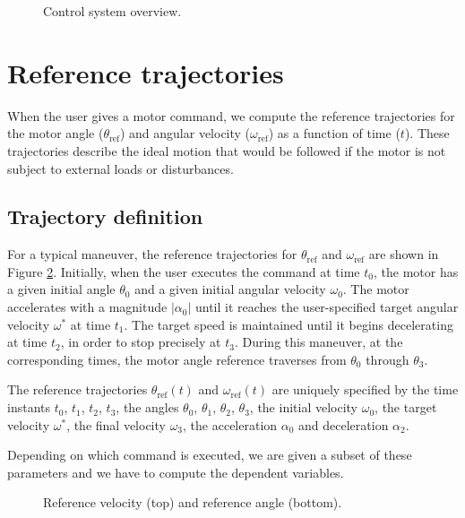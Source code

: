 \documentclass[12pt, a4paper]
{article}
\providecommand{\sub}[1]{_{\text{#1}}}
\providecommand{\w}{\omega}
\providecommand{\wt}{\w^*}
\providecommand{\wref}{\w\sub{ref}}
\renewcommand{\th}{\theta}
\providecommand{\thref}{\th\sub{ref}}
\renewcommand{\a}{\alpha}
\providecommand{\w}{\omega}
\providecommand{\abs}[1]{\left|#1\right|}
\begin{document}
\begin{figure}[H]
    \centering
    \fontsize{8}{10}\selectfont
    
    \caption{
        Control system overview.
        \label{fig:controloverview}}
\end{figure}


\section{Reference trajectories}

When the user gives a motor command, we compute the reference trajectories for
the motor angle ($\thref$) and angular velocity ($\wref$) as a function of
time ($t$). These trajectories describe the ideal motion that would be followed
if the motor is not subject to external loads or disturbances.

\subsection{Trajectory definition}

For a typical maneuver, the reference trajectories for $\thref$ and $\wref$
are shown in Figure \ref{fig:plots}. Initially, when the user executes the
command at time $t_0$, the motor has a given initial angle $\th_0$ and a given
initial angular velocity $\w_0$. The motor accelerates with a magnitude
$\abs{\a_0}$ until it reaches the user-specified target angular velocity $\wt$
at time $t_1$. The target speed is maintained until it begins decelerating at
time $t_2$, in order to stop precisely at $t_3$. During this maneuver, at the
corresponding times, the motor angle reference traverses from $\th_0$ through
$\th_3$.

The reference trajectories $\thref(t)$ and $\wref(t)$ are uniquely specified by
the time instants $t_0$, $t_1$, $t_2$, $t_3$, the angles $\th_0$, $\th_1$,
$\th_2$, $\th_3$, the initial velocity $\w_0$, the target velocity $\wt$, the
final velocity $\w_3$, the acceleration $\a_0$ and deceleration $\a_2$.

Depending on which command is executed, we are given a subset of these
parameters and we have to compute the dependent variables.


\begin{figure}[H]
    \centering
    
    \caption{
        Reference velocity (top) and reference angle (bottom).
        \label{fig:plots}}
\end{figure}
\end{document}
